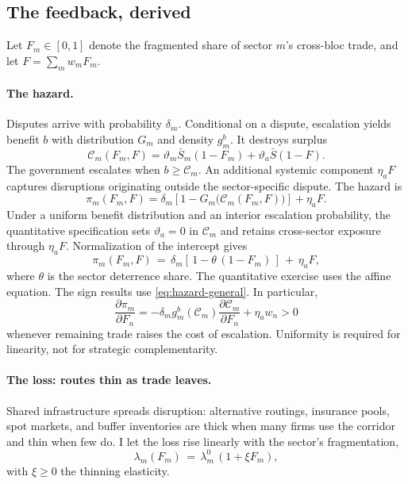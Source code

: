 \documentclass[11pt]{article}
\theoremstyle{definition}
\begin{document}
\subsection{The feedback, derived}\label{sec:feedback}

Let $F_m\in[0,1]$ denote the fragmented share of sector $m$'s cross-bloc trade, and let $F=\sum_mw_mF_m$.

\paragraph{The hazard.} Disputes arrive with probability $\delta_m$. Conditional on a dispute, escalation yields benefit $b$ with distribution $G_m$ and density $g_m^b$. It destroys surplus
\begin{equation}
\mathcal C_m(F_m,F)=\vartheta_m\bar S_m(1-F_m)+\vartheta_a\bar S(1-F).
\label{eq:escalationcost}
\end{equation}
The government escalates when $b\geq\mathcal C_m$. An additional systemic component $\eta_aF$ captures disruptions originating outside the sector-specific dispute. The hazard is
\begin{equation}
\pi_m(F_m,F)=\delta_m\left[1-G_m\big(\mathcal C_m(F_m,F)\big)\right]+\eta_aF.
\label{eq:hazard-general}
\end{equation}
Under a uniform benefit distribution and an interior escalation probability, the quantitative specification sets $\vartheta_a=0$ in $\mathcal C_m$ and retains cross-sector exposure through $\eta_aF$. Normalization of the intercept gives
\begin{equation}
\pi_m(F_m, F) \,=\, \delta_m \left[\,1 - \theta\,(1 - F_m)\,\right] \,+\, \eta_a F ,
\label{eq:hazard}
\end{equation}
where $\theta$ is the sector deterrence share. The quantitative exercise uses the affine equation. The sign results use \eqref{eq:hazard-general}. In particular,
\begin{equation}
\frac{\partial\pi_m}{\partial F_n}
=-\delta_mg_m^b(\mathcal C_m)\frac{\partial\mathcal C_m}{\partial F_n}+\eta_aw_n>0
\label{eq:generalcross}
\end{equation}
whenever remaining trade raises the cost of escalation. Uniformity is required for linearity, not for strategic complementarity.

\paragraph{The loss: routes thin as trade leaves.} Shared infrastructure spreads disruption: alternative routings, insurance pools, spot markets, and buffer inventories are thick when many firms use the corridor and thin when few do. I let the loss rise linearly with the sector's fragmentation,
\begin{equation}
\lambda_m(F_m) \,=\, \lambda_m^0\,(1 + \xi F_m),
\label{eq:thinning}
\end{equation}
with $\xi \ge 0$ the thinning elasticity.
\end{document}
